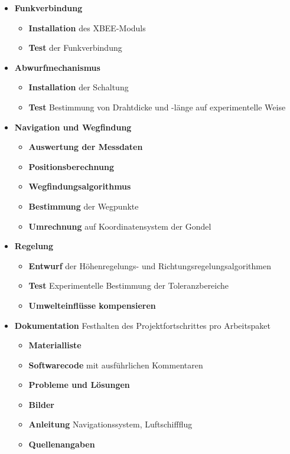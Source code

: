 \documentclass[lang=ngerman,inputenc=utf8,fontsize=10pt]{ldvarticle}
\begin{document}
\begin{itemize}
	\item \textbf{Funkverbindung}
		\begin{itemize}
		
			\item \textbf{Installation} des XBEE-Moduls
			\item \textbf{Test} der Funkverbindung
		\end{itemize}
		
	\item \textbf{Abwurfmechanismus}
		\begin{itemize}
			\item \textbf{Installation} der Schaltung
			\item \textbf{Test} Bestimmung von Drahtdicke und -länge auf experimentelle Weise
		\end{itemize}

	\item \textbf{Navigation und Wegfindung}  
		\begin{itemize}
			\item \textbf{Auswertung der Messdaten}
			\item \textbf{Positionsberechnung}
			\item \textbf{Wegfindungsalgorithmus}
			\item \textbf{Bestimmung} der Wegpunkte
			\item \textbf{Umrechnung} auf Koordinatensystem der Gondel
			
		\end{itemize}
		
	\item \textbf{Regelung}  
		\begin{itemize}
			\item \textbf{Entwurf} der Höhenregelungs- und Richtungsregelungsalgorithmen
			\item \textbf{Test} Experimentelle Bestimmung der Toleranzbereiche
			\item \textbf{Umwelteinflüsse kompensieren}
		\end{itemize}
	
	\item \textbf{Dokumentation} Festhalten des Projektfortschrittes pro Arbeitspaket
		\begin{itemize}
			\item \textbf{Materialliste}
			\item \textbf{Softwarecode} mit ausführlichen Kommentaren
			\item \textbf{Probleme und Lösungen}
			\item \textbf{Bilder}
			\item \textbf{Anleitung} Navigationssystem, Luftschiffflug
			\item \textbf{Quellenangaben}
		\end{itemize}
\end{itemize}
\end{document}
